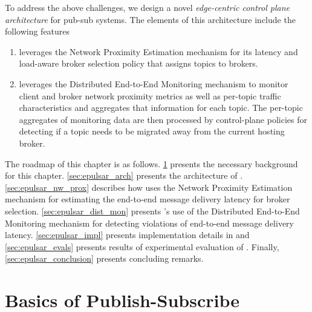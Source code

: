 \par To address the above challenges, we design a novel \textit{edge-centric control plane architecture} for pub-sub systems.  The elements of this architecture include the following features
\begin{enumerate}
\item \epulsar leverages the Network Proximity Estimation mechanism for its latency and load-aware broker selection policy that assigns topics to brokers. 
\item \epulsar leverages the Distributed End-to-End Monitoring mechanism to monitor client and broker network proximity metrics as well as per-topic traffic characteristics and aggregates that information for each topic. The per-topic aggregates of monitoring data are then processed by control-plane policies for detecting if a topic needs to be migrated away from the current hosting broker.
\end{enumerate}
The roadmap of this chapter is as follows. \cref{sec:epulsar_background} presents the necessary background for this chapter. \cref{sec:epulsar_arch} presents the architecture of \epulsar{}. \cref{sec:epulsar_nw_prox} describes how \epulsar{} uses the Network Proximity Estimation mechanism for estimating the end-to-end message delivery latency for broker selection. \cref{sec:epulsar_dist_mon} presents \epulsar's use of the Distributed End-to-End Monitoring mechanism for detecting violations of end-to-end message delivery latency. \cref{sec:epulsar_impl} presents implementation details in \epulsar{} and \cref{sec:epulsar_evals} presents results of experimental evaluation of \epulsar{}. Finally, \cref{sec:epulsar_conclusion} presents concluding remarks.

\section{Basics of Publish-Subscribe}
\label{sec:epulsar_background}
